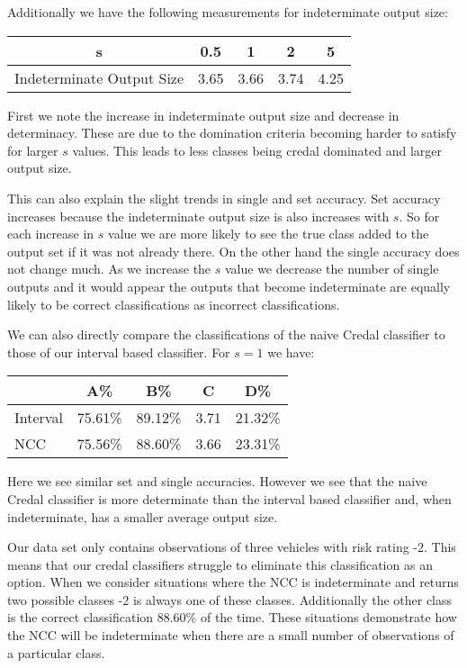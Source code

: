 Additionally we have the following measurements for indeterminate output size:
\begin{center}
\begin{tabular}{c|c c c c}
s & 0.5 & 1 & 2 & 5 \\
\hline
Indeterminate Output Size & 3.65 & 3.66 & 3.74 & 4.25
\end{tabular}
\end{center}

First we note the increase in indeterminate output size and decrease in determinacy.
These are due to the domination criteria becoming harder to satisfy for larger $s$ values.
This leads to less classes being credal dominated and larger output size.

This can also explain the slight trends in single and set accuracy.
Set accuracy increases because the indeterminate output size is also increases with $s$.
So for each increase in $s$ value we are more likely to see the true class added to the output set if it was not already there.
On the other hand the single accuracy does not change much.
As we increase the $s$ value we decrease the number of single outputs and it would appear the outputs that become indeterminate are equally likely to be correct classifications as incorrect classifications.

We can also directly compare the classifications of the naive Credal classifier to those of our interval based classifier. For $s=1$ we have:
\begin{center}
\begin{tabular}{l|c c c c}
         & A\%     & B\%     & C    & D\%     \\
\hline
Interval & 75.61\% & 89.12\% & 3.71 & 21.32\% \\
NCC      & 75.56\% & 88.60\% & 3.66 & 23.31\% \\
\end{tabular}
\end{center}
Here we see similar set and single accuracies.
However we see that the naive Credal classifier is more determinate than the interval based classifier and, when indeterminate, has a smaller average output size.

Our data set only contains observations of three vehicles with risk rating -2.
This means that our credal classifiers struggle to eliminate this classification as an option.
When we consider situations where the NCC is indeterminate and returns two possible classes -2 is always one of these classes.
Additionally the other class is the correct classification 88.60\% of the time.
These situations demonstrate how the NCC will be indeterminate when there are a small number of observations of a particular class.

